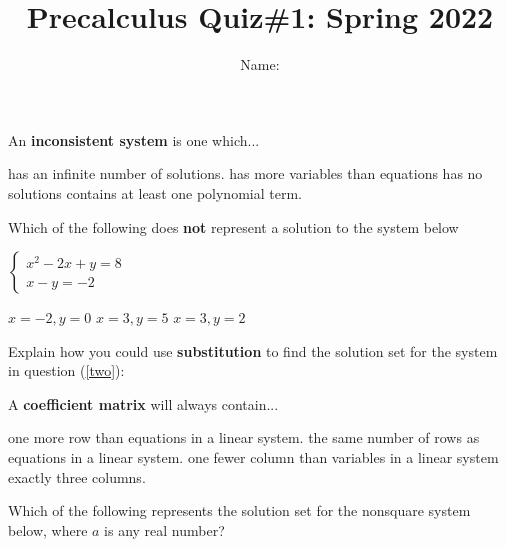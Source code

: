 \documentclass{exam}
\title{Precalculus Quiz\#1: Spring 2022  }
\author{  Name:   }
\begin{document}
\maketitle
\thispagestyle{empty}

\begin{questions}
\question 

\begin{multicols}{2}
An \textbf{inconsistent system} is one  which... 

\columnbreak
\begin{choices}
\choice has an infinite number of solutions.
\choice has more variables than equations
\choice has no solutions
\choice contains at least one polynomial term.
\end{choices}

\end{multicols}

\question 
\label{two}
\begin{multicols}{2}
Which of the following does \textbf{not} represent a solution to the system below

$
\begin{cases}
x^2 -2x + y = 8 \\
x - y = -2
\end{cases}
$

\begin{choices}
\choice  $x = -2, y = 0$
\choice $x = 3, y = 5$
\choice $x = 3, y = 2 $
\end{choices}
\end{multicols}

\question Explain how you could use \textbf{substitution} to find the solution set for the system in question (\ref{two}):

\makeemptybox{2in}
\question
\begin{multicols}{2}
A \textbf{coefficient matrix} will always contain...

\columnbreak

\begin{choices}
\choice one more row than equations in a linear system.
\choice the same number of rows as equations in a linear system.
\choice one fewer column than variables in a linear system
\choice  exactly three columns.
\end{choices}
\end{multicols}

\question


\begin{multicols}{2}
 Which of the following represents the solution set for the  nonsquare system below, where $a$ is any real number?


\end{multicols}
\end{questions}
\end{document}
